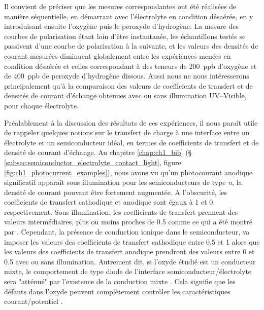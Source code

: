 \begin{refsection}
    Il convient de préciser que les mesures correspondantes ont été réalisées de manière séquentielle, en démarrant avec
    l’électrolyte en condition désaérée, en y introduisant ensuite l’oxygène puis le peroxyde d’hydrogène. La mesure des
    courbes de polarisation étant loin d’être instantanée, les échantillons testés se passivent d’une courbe de polarisation
    à la suivante, et les valeurs des densités de courant mesurées diminuent globalement entre les expériences menées en
    condition désaérée et celles correspondant à des teneurs de 200~ppb d’oxygène et de 400~ppb de peroxyde d’hydrogène
    dissous. Aussi nous ne nous intéresserons principalement qu’à la comparaison des valeurs de coefficients de transfert et
    de densités de courant d’échange obtenues avec ou sans illumination UV--Visible, pour chaque électrolyte.

    Préalablement à la discussion des résultats de ces expériences, il nous paraît utile de rappeler quelques notions sur le
    transfert de charge à une interface entre un électrolyte et un semiconducteur idéal, en termes de coefficients de
    transfert et de densité de courant d’échange. Au chapitre \ref{chap:ch1_bib} (\S
    \ref{subsec:semiconductor_electrolyte_contact_light},
    figure \ref{fig:ch1_photocurrent_examples}), nous avons vu qu’un
    photocourant anodique significatif apparaît sous illumination pour les semiconducteurs de type \emph{n}, la densité de courant
    pouvant être fortement augmentée. A l’obscurité, les coefficients de transfert cathodique et anodique sont égaux à 1 et
    0, respectivement. Sous illumination, les coefficients de transfert prennent des valeurs intermédiaires, plus ou moins
    proches de 0.5 comme ce qui a été montré par \citet{Bertagna1996}. Cependant, la présence de conduction ionique dans le
    semiconducteur, va imposer les valeurs des coefficients de transfert cathodique entre 0.5 et 1 alors que les valeurs des
    coefficients de transfert anodique prendront des valeurs entre 0 et 0.5 avec ou sans illumination. Autrement dit, si
    l’oxyde étudié est un conducteur mixte, le comportement de type diode de l’interface semiconducteur/électrolyte sera 
    "atténué" par l’existence de la conduction mixte \citep{Gerischer1985}. Cela signifie que les défauts dans l’oxyde peuvent complètement
    contrôler les caractéristiques courant/potentiel \citep{Morrison1980}.


\end{refsection}
